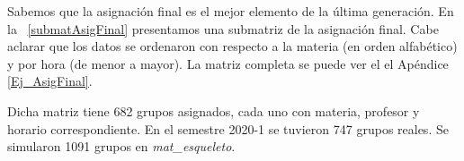 %

Sabemos que la asignación final es el mejor elemento de la última generación. En la \tablename{~\ref{submatAsigFinal}} presentamos una submatriz de la asignación final. Cabe aclarar que los datos se ordenaron con respecto a la materia (en orden alfabético) y por hora (de menor a mayor). La matriz completa se puede ver el el Apéndice \ref{Ej_AsigFinal}.

Dicha matriz tiene 682 grupos asignados, cada uno con materia, profesor y horario correspondiente. En el semestre 2020-1 se tuvieron 747 grupos reales. Se simularon 1091 grupos en \textit{mat\_esqueleto}.

